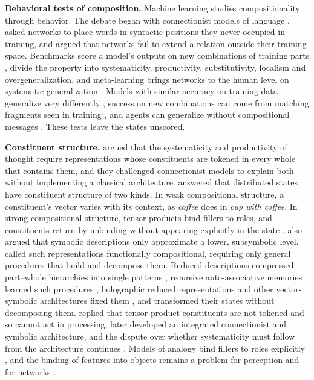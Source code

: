 \documentclass[10pt]{article}
\theoremstyle{plain}
\theoremstyle{remark}
\begin{document}
\textbf{Behavioral tests of composition.} Machine learning studies compositionality through behavior. The debate began with connectionist models of language \citep{rumelhart1986,pinker1988,elman1990,elman1991}. \citet{hadley1994} asked networks to place words in syntactic positions they never occupied in training, and \citet{marcus1998,marcus2001} argued that networks fail to extend a relation outside their training space. Benchmarks score a model's outputs on new combinations of training parts \citep{lake2018,keysers2020,kim2020cogs}, \citet{hupkes2020} divide the property into systematicity, productivity, substitutivity, localism and overgeneralization, and meta-learning brings networks to the human level on systematic generalization \citep{lake2023}. Models with similar accuracy on training data generalize very differently \citep{mccoy2020berts}, success on new combinations can come from matching fragments seen in training \citep{dziri2023}, and agents can generalize without compositional messages \citep{chaabouni2020}. These tests leave the states unscored.

\textbf{Constituent structure.} \citet{fodor1988} argued that the systematicity and productivity of thought require representations whose constituents are tokened in every whole that contains them, and they challenged connectionist models to explain both without implementing a classical architecture. \citet{smolensky1987} answered that distributed states have constituent structure of two kinds. In weak compositional structure, a constituent's vector varies with its context, as \emph{coffee} does in \emph{cup with coffee}. In strong compositional structure, tensor products bind fillers to roles, and constituents return by unbinding without appearing explicitly in the state \citep{smolensky1990}. \citet{smolensky1988} also argued that symbolic descriptions only approximate a lower, subsymbolic level. \citet{vangelder1990} called such representations functionally compositional, requiring only general procedures that build and decompose them. Reduced descriptions compressed part--whole hierarchies into single patterns \citep{hinton1990}, recursive auto-associative memories learned such procedures \citep{pollack1990}, holographic reduced representations and other vector-symbolic architectures fixed them \citep{plate1995,gayler2006,kanerva2009}, and \citet{chalmers1990} transformed their states without decomposing them. \citet{fodor1990} replied that tensor-product constituents are not tokened and so cannot act in processing, \citet{smolensky2006} later developed an integrated connectionist and symbolic architecture, and the dispute over whether systematicity must follow from the architecture continues \citep{aizawa2003,quiltydunn2023,russin2024,woydt2025,goodale2026}. Models of analogy bind fillers to roles explicitly \citep{hummel1997,doumas2022}, and the binding of features into objects remains a problem for perception and for networks \citep{treisman1980,greff2020}.
\end{document}
